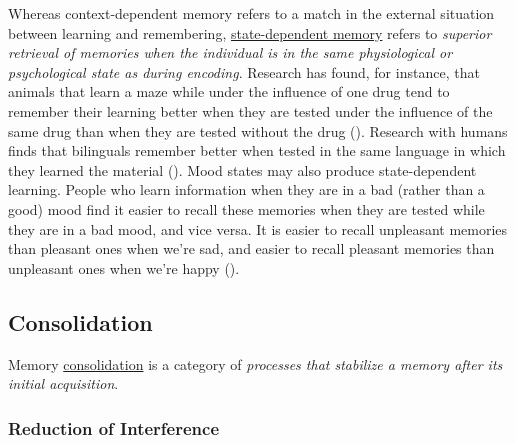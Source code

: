 \documentclass[
]{krantz}
\begin{document}
Whereas context-dependent memory refers to a match in the external situation between learning and remembering, \hyperref[state-dependent-memory]{state-dependent memory} refers to \emph{superior retrieval of memories when the individual is in the same physiological or psychological state as during encoding}. Research has found, for instance, that animals that learn a maze while under the influence of one drug tend to remember their learning better when they are tested under the influence of the same drug than when they are tested without the drug (). Research with humans finds that bilinguals remember better when tested in the same language in which they learned the material (). Mood states may also produce state-dependent learning. People who learn information when they are in a bad (rather than a good) mood find it easier to recall these memories when they are tested while they are in a bad mood, and vice versa. It is easier to recall unpleasant memories than pleasant ones when we're sad, and easier to recall pleasant memories than unpleasant ones when we're happy ().

\subsection*{Consolidation}\label{consolidation}


Memory \hyperref[consolidation]{consolidation} is a category of \emph{processes that stabilize a memory after its initial acquisition}.

\subsubsection*{Reduction of Interference}\label{reduction-of-interference}
\end{document}
